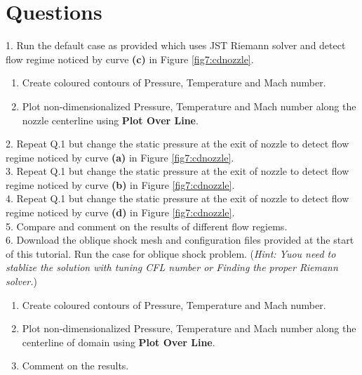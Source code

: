 \section{Questions}
1. Run the default case as provided which uses JST Riemann solver and detect flow regime noticed by curve \textbf{(c)} in Figure \ref{fig7:cdnozzle}.
\begin{enumerate}[label=(\alph*)]
	\item Create coloured contours of Pressure, Temperature and Mach number.
	\item Plot non-dimensionalized Pressure, Temperature and Mach number along the nozzle centerline using \textbf{Plot Over Line}.
\end{enumerate}
2. Repeat Q.1 but change the static pressure at the exit of nozzle to detect flow regime noticed by curve \textbf{(a)} in Figure \ref{fig7:cdnozzle}.\\
3. Repeat Q.1 but change the static pressure at the exit of nozzle to detect flow regime noticed by curve \textbf{(b)} in Figure \ref{fig7:cdnozzle}.\\
4. Repeat Q.1 but change the static pressure at the exit of nozzle to detect flow regime noticed by curve \textbf{(d)} in Figure \ref{fig7:cdnozzle}.\\
5. Compare and comment on the results of different flow regiems.\\
6. Download the oblique shock mesh and configuration files provided at the start of this tutorial. Run the case for oblique shock problem.
(\textit{Hint: Yuou need to stablize the solution with tuning CFL number or Finding the proper Riemann solver.})
\begin{enumerate}[label=(\alph*)]
	\item Create coloured contours of Pressure, Temperature and Mach number.
	\item Plot non-dimensionalized Pressure, Temperature and Mach number along the centerline of domain using \textbf{Plot Over Line}.
	\item Comment on the results.
\end{enumerate}


